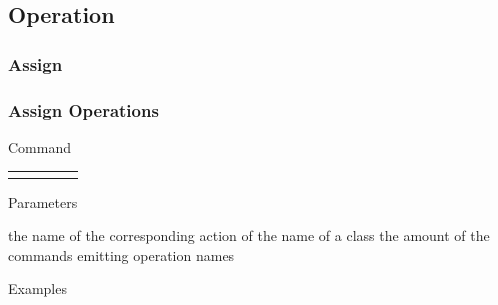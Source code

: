 \documentclass[9pt]{beamer}
\begin{document}
\subsection{Operation}

\subsubsection{Assign}

\begin{frame}[t] \frametitle{Assign Operations}

	\begin{block}{Command} 
		\begin{tabularx}{\textwidth}{@{}l@{}l@{}l@{}l@{}R}
			 &
				 &
				 &
				 & \InstrItem
		\end{tabularx}
	\end{block}

	\begin{block}{Parameters} \begin{itemize}
		    the name of the corresponding action of 
		     the name of a class
		    the amount of the commands emitting operation names
	\end{itemize} \end{block}

	\begin{block}{Examples}
	\end{block}

\end{frame}
\end{document}
